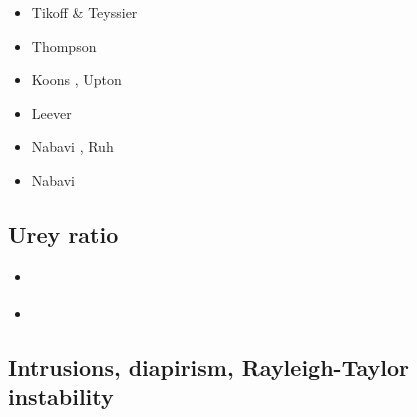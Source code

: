 \begin{scriptsize}
\begin{itemize}
\item[\nineteenninetyfour] Tikoff \& Teyssier \cite{tite94}
\item[\nineteenninetyseven] Thompson \etal \cite{thsj97}
\item[\twothousandthree] Koons \etal \cite{konc03}, Upton \etal \cite{upke03}
\item[\twothousandeleven] Leever \etal \cite{legs11}
\item[\twothousandseventeen] Nabavi \etal \cite{naam17}, Ruh \etal \cite{rugb17}
\item[\twothousandeighteen] Nabavi \etal \cite{naam18}
\end{itemize}
\end{scriptsize}

\subsection{Urey ratio}

\begin{scriptsize}
\begin{itemize}
\item[\twothousandeight] 
\textcite{kore08} 
\item[\twothousandtwelve] 
\textcite{nata12} 
\end{itemize}
\end{scriptsize}

\subsection{Intrusions, diapirism, Rayleigh-Taylor instability}

